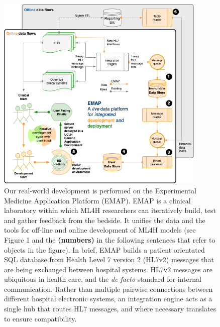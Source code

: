 \documentclass[utf8]{FrontiersinVancouver}
\begin{document}
\begin{figure}[h!]
\begin{center}
\includegraphics[width=10cm]{assets/emap.png}%
\end{center}
\caption{Our real-world development is performed on the  Experimental Medicine Application Platform (EMAP). EMAP is a clinical laboratory within which ML4H researchers can iteratively build, test and gather feedback from the bedside. It unifies the data and the tools for off-line and online development of ML4H models (see Figure 1 and the \textbf{(numbers)} in the following sentences that refer to objects in the figure).\newline
In brief, EMAP builds a patient orientated SQL database from Health Level 7 version 2 (HL7v2) messages that are being exchanged between hospital systems. HL7v2 messages are ubiquitous in health care, and the \textit{de facto} standard for internal communication. Rather than multiple pairwise connections between different hospital electronic systems, an integration engine acts as a single hub that routes HL7 messages, and where necessary translates to ensure compatibility.\newline
}
\end{figure}
\end{document}
